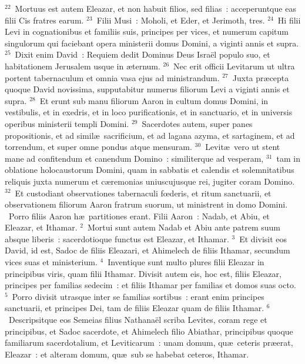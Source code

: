 ${}^{22}$~Mortuus est autem Eleazar, et non habuit filios, sed filias~: acceperuntque eas filii Cis fratres earum.
${}^{23}$~Filii Musi~: Moholi, et Eder, et Jerimoth, tres.
${}^{24}$~Hi filii Levi in cognationibus et familiis suis, principes per vices, et numerum capitum singulorum qui faciebant opera ministerii domus Domini, a viginti annis et supra.
${}^{25}$~Dixit enim David~: Requiem dedit Dominus Deus Isra\"el populo suo, et habitationem Jerusalem usque in \ae ternum.
${}^{26}$~Nec erit officii Levitarum ut ultra portent tabernaculum et omnia vasa ejus ad ministrandum.
${}^{27}$~Juxta pr\ae cepta quoque David novissima, supputabitur numerus filiorum Levi a viginti annis et supra.
${}^{28}$~Et erunt sub manu filiorum Aaron in cultum domus Domini, in vestibulis, et in exedris, et in loco purificationis, et in sanctuario, et in universis operibus ministerii templi Domini.
${}^{29}$~Sacerdotes autem, super panes propositionis, et ad simil\ae\ sacrificium, et ad lagana azyma, et sartaginem, et ad torrendum, et super omne pondus atque mensuram.
${}^{30}$~Levit\ae\ vero ut stent mane ad confitendum et canendum Domino~: similiterque ad vesperam,
${}^{31}$~tam in oblatione holocaustorum Domini, quam in sabbatis et calendis et solemnitatibus reliquis juxta numerum et c\ae remonias uniuscujusque rei, jugiter coram Domino.
${}^{32}$~Et custodiant observationes tabernaculi fœderis, et ritum sanctuarii, et observationem filiorum Aaron fratrum suorum, ut ministrent in domo Domini.
~\lettrine[lines=10,image=true,loversize=0.05,lraise=-0.03]{P}{}orro filiis Aaron h\ae\ partitiones erant. Filii Aaron~: Nadab, et Abiu, et Eleazar, et Ithamar.
${}^{2}$~Mortui sunt autem Nadab et Abiu ante patrem suum absque liberis~: sacerdotioque functus est Eleazar, et Ithamar.
${}^{3}$~Et divisit eos David, id est, Sadoc de filiis Eleazari, et Ahimelech de filiis Ithamar, secundum vices suas et ministerium.
${}^{4}$~Inventique sunt multo plures filii Eleazar in principibus viris, quam filii Ithamar. Divisit autem eis, hoc est, filiis Eleazar, principes per familias sedecim~: et filiis Ithamar per familias et domos suas octo.
${}^{5}$~Porro divisit utrasque inter se familias sortibus~: erant enim principes sanctuarii, et principes Dei, tam de filiis Eleazar quam de filiis Ithamar.
${}^{6}$~Descripsitque eos Semeias filius Nathana\"el scriba Levites, coram rege et principibus, et Sadoc sacerdote, et Ahimelech filio Abiathar, principibus quoque familiarum sacerdotalium, et Leviticarum~: unam domum, qu\ae\ ceteris pr\ae erat, Eleazar~: et alteram domum, qu\ae\ sub se habebat ceteros, Ithamar.
